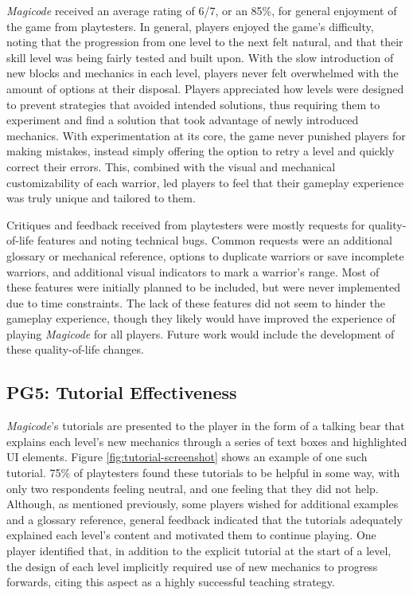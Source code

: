 \documentclass[10pt,twocolumn]{article}
\begin{document}
\textit{Magicode} received an average rating of 6/7, or an 85\%, for general enjoyment of the game from playtesters. In general, players enjoyed the game's difficulty, noting that the progression from one level to the next felt natural, and that their skill level was being fairly tested and built upon. With the slow introduction of new blocks and mechanics in each level, players never felt overwhelmed with the amount of options at their disposal. Players appreciated how levels were designed to prevent strategies that avoided intended solutions, thus requiring them to experiment and find a solution that took advantage of newly introduced mechanics. With experimentation at its core, the game never punished players for making mistakes, instead simply offering the option to retry a level and quickly correct their errors. This, combined with the visual and mechanical customizability of each warrior, led players to feel that their gameplay experience was truly unique and tailored to them.

Critiques and feedback received from playtesters were mostly requests for quality-of-life features and noting technical bugs. Common requests were an additional glossary or mechanical reference, options to duplicate warriors or save incomplete warriors, and additional visual indicators to mark a warrior’s range. Most of these features were initially planned to be included, but were never implemented due to time constraints. The lack of these features did not seem to hinder the gameplay experience, though they likely would have improved the experience of playing \textit{Magicode} for all players. Future work would include the development of these quality-of-life changes.

\subsection{PG5: Tutorial Effectiveness}
\textit{Magicode}’s tutorials are presented to the player in the form of a talking bear that explains each level’s new mechanics through a series of text boxes and highlighted UI elements. Figure \ref{fig:tutorial-screenshot} shows an example of one such tutorial. 75\% of playtesters found these tutorials to be helpful in some way, with only two respondents feeling neutral, and one feeling that they did not help. Although, as mentioned previously, some players wished for additional examples and a glossary reference, general feedback indicated that the tutorials adequately explained each level’s content and motivated them to continue playing. One player identified that, in addition to the explicit tutorial at the start of a level, the design of each level implicitly required use of new mechanics to progress forwards, citing this aspect as a highly successful teaching strategy.
\end{document}
